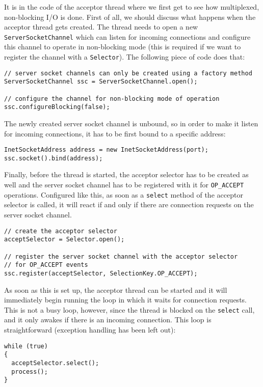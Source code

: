 \documentclass[a4paper,10pt]{article}
\begin{document}
It is in the code of the acceptor thread where we first get to see how multiplexed, non-blocking I/O is done. First of all,
we should discuss what happens when the acceptor thread gets created. The thread needs to open a new
\texttt{ServerSocketChannel} which can listen for incoming connections and configure this channel to operate
in non-blocking mode (this is required if we want to register the channel with a \texttt{Selector}). The following
piece of code does that:

\begin{lstlisting}
// server socket channels can only be created using a factory method
ServerSocketChannel ssc = ServerSocketChannel.open();

// configure the channel for non-blocking mode of operation
ssc.configureBlocking(false);
\end{lstlisting}

The newly created server socket channel is unbound, so in order to make it listen for incoming connections,
it has to be first bound to a specific address:

\begin{lstlisting}
InetSocketAddress address = new InetSocketAddress(port);
ssc.socket().bind(address);
\end{lstlisting}

Finally, before the thread is started, the acceptor selector has to be created as well and the server socket
channel has to be registered with it for \texttt{OP\_ACCEPT} operations. Configured like this, as soon as
a \texttt{select} method of the acceptor selector is called, it will react if and only if there are connection
requests on the server socket channel.

\begin{lstlisting}
// create the acceptor selector
acceptSelector = Selector.open();

// register the server socket channel with the acceptor selector
// for OP_ACCEPT events
ssc.register(acceptSelector, SelectionKey.OP_ACCEPT);
\end{lstlisting}

As soon as this is set up, the acceptor thread can be started and it will immediately begin running the
loop in which it waits for connection requests. This is not a busy loop, however, since the thread is blocked
on the \texttt{select} call, and it only awakes if there is an incoming connection. This loop is straightforward
(exception handling has been left out):

\begin{lstlisting}
while (true)
{
  acceptSelector.select();
  process();
}
\end{lstlisting}
\end{document}
